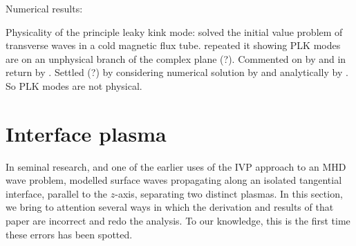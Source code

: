 \documentclass[12pt]{../style-files/ociamthesis}
\begin{document}
Numerical results: \cite{ter_etal06}

Physicality of the principle leaky kink mode: \cite{cal03} solved the initial value problem of transverse waves in a cold magnetic flux tube. \cite{rud_etal06} repeated it showing PLK modes are on an unphysical branch of the complex plane (?). Commented on by \cite{cal06} and in return by \cite{rud_etal06b}. Settled (?) by considering numerical solution by \cite{ter_etal07} and analytically by \cite{and_etal07}. So PLK modes are not physical.

\color{black}

\section{Interface plasma}
\label{sec: IVP int}

In seminal research, and one of the earlier uses of the IVP approach to an MHD wave problem, \cite{rae_etal81} modelled surface waves propagating along an isolated tangential interface, parallel to the $z$-axis, separating two distinct plasmas. In this section, we bring to attention several ways in which the derivation and results of that paper are incorrect and redo the analysis. To our knowledge, this is the first time these errors has been spotted.
\end{document}
